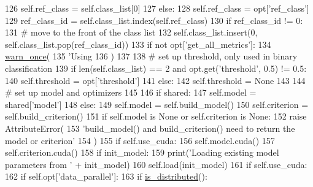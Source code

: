 \begin{DoxyCode}
126             self.ref\_class = self.class\_list[0]
127         \textcolor{keywordflow}{else}:
128             self.ref\_class = opt[\textcolor{stringliteral}{'ref\_class'}]
129             ref\_class\_id = self.class\_list.index(self.ref\_class)
130             \textcolor{keywordflow}{if} ref\_class\_id != 0:
131                 \textcolor{comment}{# move to the front of the class list}
132                 self.class\_list.insert(0, self.class\_list.pop(ref\_class\_id))
133         \textcolor{keywordflow}{if} \textcolor{keywordflow}{not} opt[\textcolor{stringliteral}{'get\_all\_metrics'}]:
134             \hyperlink{namespaceparlai_1_1utils_1_1misc_a884a3aefa90581f53bc592fa6a78dc43}{warn\_once}(
135                 \textcolor{stringliteral}{'Using %
136             )
137 
138         \textcolor{comment}{# set up threshold, only used in binary classification}
139         \textcolor{keywordflow}{if} len(self.class\_list) == 2 \textcolor{keywordflow}{and} opt.get(\textcolor{stringliteral}{'threshold'}, 0.5) != 0.5:
140             self.threshold = opt[\textcolor{stringliteral}{'threshold'}]
141         \textcolor{keywordflow}{else}:
142             self.threshold = \textcolor{keywordtype}{None}
143 
144         \textcolor{comment}{# set up model and optimizers}
145 
146         \textcolor{keywordflow}{if} shared:
147             self.model = shared[\textcolor{stringliteral}{'model'}]
148         \textcolor{keywordflow}{else}:
149             self.model = self.build\_model()
150             self.criterion = self.build\_criterion()
151             \textcolor{keywordflow}{if} self.model \textcolor{keywordflow}{is} \textcolor{keywordtype}{None} \textcolor{keywordflow}{or} self.criterion \textcolor{keywordflow}{is} \textcolor{keywordtype}{None}:
152                 \textcolor{keywordflow}{raise} AttributeError(
153                     \textcolor{stringliteral}{'build\_model() and build\_criterion() need to return the model or criterion'}
154                 )
155             \textcolor{keywordflow}{if} self.use\_cuda:
156                 self.model.cuda()
157                 self.criterion.cuda()
158             \textcolor{keywordflow}{if} init\_model:
159                 print(\textcolor{stringliteral}{'Loading existing model parameters from '} + init\_model)
160                 self.load(init\_model)
161             \textcolor{keywordflow}{if} self.use\_cuda:
162                 \textcolor{keywordflow}{if} self.opt[\textcolor{stringliteral}{'data\_parallel'}]:
163                     \textcolor{keywordflow}{if} \hyperlink{namespaceparlai_1_1utils_1_1distributed_a023acb5e3b66e1f27e21247c35661279}{is\_distributed}():
}
\end{DoxyCode}
